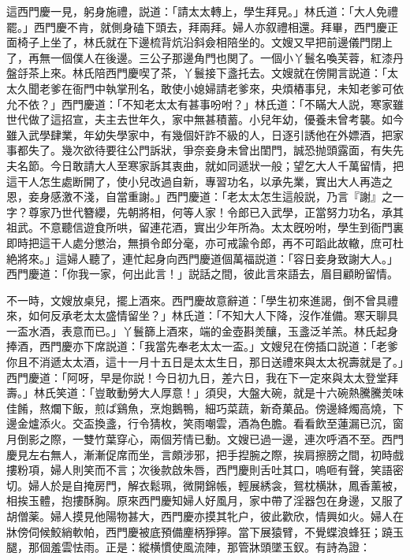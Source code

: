這西門慶一見，躬身施禮，説道：「請太太轉上，學生拜見。」林氏道：「大人免禮罷。」西門慶不肯，就側身磕下頭去，拜兩拜。婦人亦叙禮相還。拜畢，西門慶正面椅子上坐了，林氏就在下邊梳背炕沿斜僉相陪坐的。文嫂又早把前邊儀門閉上了，再無一個僕人在後邊。三公子那邊角門也関了。一個小丫鬟名喚芙蓉，紅漆丹盤㧱茶上來。林氏陪西門慶喫了茶，丫鬟接下盞托去。文嫂就在傍開言説道：「太太久聞老爹在衙門中執掌刑名，敢使小媳婦請老爹來，央煩樁事兒，未知老爹可依允不依？」西門慶道：「不知老太太有甚事吩咐？」林氏道：「不瞞大人説，寒家雖世代做了這招宣，夫主去世年久，家中無甚積蓄。小兒年幼，優養未曾考襲。如今雖入武學肆業，年幼失學家中，有幾個奸詐不級的人，日逐引誘他在外嫖酒，把家事都失了。幾次欲待要往公門訴狀，爭奈妾身未曾出閨門，誠恐抛頭露面，有失先夫名節。今日敢請大人至寒家訴其衷曲，就如同遞狀一般；望乞大人千萬留情，把這干人怎生處断開了，使小兒改過自新，專習功名，以承先業，實出大人再造之恩，妾身感激不淺，自當重謝。」西門慶道：「老太太怎生這般説，乃言『謝』之一字？尊家乃世代簪纓，先朝將相，何等人家！令郎已入武學，正當努力功名，承其祖武。不意聽信遊食所哄，留連花酒，實出少年所為。太太旣吩咐，學生到衙門裏即時把這干人處分懲治，無損令郎分毫，亦可戒諭令郎，再不可蹈此故轍，庶可杜絶將來。」這婦人聽了，連忙起身向西門慶道個萬福説道：「容日妾身致謝大人。」西門慶道：「你我一家，何出此言！」説話之間，彼此言來語去，眉目顧盼留情。

不一時，文嫂放桌兒，擺上酒來。西門慶故意辭道：「學生初來進謁，倒不曾具禮來，如何反承老太太盛情留坐？」林氏道：「不知大人下降，沒作准備。寒天聊具一盃水酒，表意而已。」丫鬟篩上酒來，端的金壺斟羙釀，玉盞泛羊羔。林氏起身捧酒，西門慶亦下席説道：「我當先奉老太太一盃。」文嫂兒在傍插口説道：「老爹你且不消遞太太酒，這十一月十五日是太太生日，那日送禮來與太太祝壽就是了。」西門慶道：「阿呀，早是你説！今日初九日，差六日，我在下一定來與太太登堂拜壽。」林氏笑道：「豈敢動勞大人厚意！」須臾，大盤大碗，就是十六碗熱騰騰羙味佳餚，熬爛下飯，煎ぱ鷄魚，烹炮鵝鴨，細巧菜蔬，新奇菓品。傍邊絳燭高燒，下邊金爐添火。交盃換盞，行令猜枚，笑雨嘲雲，酒為色膽。看看飲至蓮漏已沉，窗月倒影之際，一雙竹葉穿心，兩個芳情已動。文嫂已過一邊，連次呼酒不至。西門慶見左右無人，漸漸促席而坐，言頗涉邪，把手揑腕之際，挨肩擦膀之間，初時戲摟粉項，婦人則笑而不言；次後款啟朱唇，西門慶則舌吐其口，嗚咂有聲，笑語密切。婦人於是自掩房門，解衣鬆珮，微開錦帳，輕展綉衾，鴛枕横牀，鳳香薰被，相挨玉體，抱摟酥胸。原來西門慶知婦人好風月，家中帶了淫器包在身邊，又服了胡僧薬。婦人摸見他陽物甚大，西門慶亦摸其牝户，彼此歡欣，情興如火。婦人在牀傍伺候鮫綃軟帕，西門慶被底預備麈柄猙獰。當下展猿臂，不覺蝶浪蜂狂；蹺玉腿，那個羞雲怯雨。正是：縱横慣使風流陣，那管牀頭墜玉釵。有詩為證：


